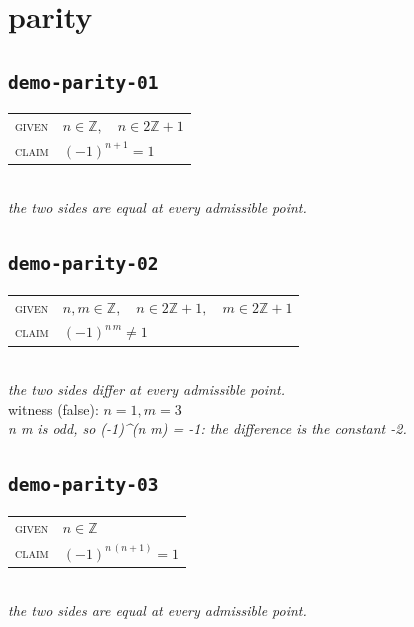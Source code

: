 \documentclass[11pt]{article}
\begin{document}
\section*{parity}
\subsection*{\texttt{demo-parity-01}}
\begin{tabular}{@{}l@{\quad}l@{}}
\textsc{given} & $n \in \mathbb{Z},\quad n \in 2\mathbb{Z} + 1$ \\[4pt]
\textsc{claim} & $\displaystyle \left(-1\right)^{n + 1} = 1$ \\
\end{tabular}\\[2pt]
{\small\emph{the two sides are equal at every admissible point.}}\\

\subsection*{\texttt{demo-parity-02}}
\begin{tabular}{@{}l@{\quad}l@{}}
\textsc{given} & $n, m \in \mathbb{Z},\quad n \in 2\mathbb{Z} + 1,\quad m \in 2\mathbb{Z} + 1$ \\[4pt]
\textsc{claim} & $\displaystyle \left(-1\right)^{n \, m} \neq 1$ \\
\end{tabular}\\[2pt]
{\small\emph{the two sides differ at every admissible point.}}\\
{\footnotesize\color{gray}witness (false): $n = 1, m = 3$}\\
\emph{n m is odd, so (-1)\textasciicircum{}(n m) = -1: the difference is the constant -2.}\\

\subsection*{\texttt{demo-parity-03}}
\begin{tabular}{@{}l@{\quad}l@{}}
\textsc{given} & $n \in \mathbb{Z}$ \\[4pt]
\textsc{claim} & $\displaystyle \left(-1\right)^{n \, \left(n + 1\right)} = 1$ \\
\end{tabular}\\[2pt]
{\small\emph{the two sides are equal at every admissible point.}}\\
\end{document}
